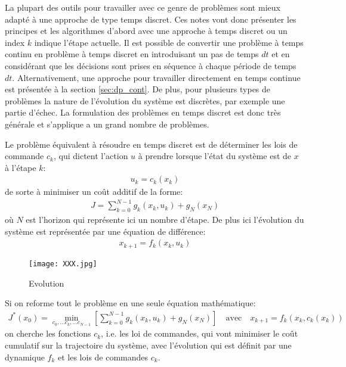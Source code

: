 La plupart des outils pour travailler avec ce genre de problèmes sont mieux adapté à une approche de type temps discret. Ces notes vont donc présenter les principes et les algorithmes d'abord avec une approche à temps discret ou un index $k$ indique l'étape actuelle. Il est possible de convertir une problème à temps continu en problème à temps discret en introduisant un pas de temps $dt$ et en considérant que les décisions sont prises en séquence à chaque période de temps $dt$. Alternativement, une approche pour travailler directement en temps continue est présentée à la section \ref{sec:dp_cont}. De plus, pour plusieurs types de problèmes la nature de l'évolution du système est discrètes, par exemple une partie d'échec. La formulation des problèmes en temps discret est donc très générale et s'applique a un grand nombre de problèmes.

Le problème équivalent à résoudre en temps discret est de déterminer les lois de commande $c_k$, qui dictent l'action $u$ à prendre lorsque l'état du système est de $x$ à l'étape $k$:
\begin{align}
u_k = c_k( x_k )
\end{align}
de sorte à minimiser un coût additif de la forme:
\begin{align}
    J = \sum_{k=0}^{N-1} g_k(x_k, u_k) + g_N( x_N )
\end{align}
où $N$ est l'horizon qui représente ici un nombre d'étape. De plus ici l'évolution du système est représentée par une équation de différence:
\begin{align}
    x_{k+1} = f_k( x_k, u_k)
\end{align}

\begin{figure}[H]
	\centering
	\vspace{-10pt}
		\texttt{[image: XXX.jpg]}
		\caption{Evolution}
		\label{fig:evolution}
\end{figure}

Si on reforme tout le problème en une seule équation mathématique:
\begin{align}
    J^*(x_0) = \min_{c_0, ... c_k, ... c_{N-1}} 
    \left[ \sum_{k=0}^{N-1} g_k(x_k, u_k) + g_N( x_N )
    \right] \quad
    \text{avec} \quad
    x_{k+1} = f_k( x_k, c_k(x_k) )
\end{align}
on cherche les fonctions $c_k$, i.e. les loi de commandes, qui vont minimiser le coût cumulatif  sur la trajectoire du système, avec l'évolution qui est définit par une dynamique $f_k$ et les lois de commandes $c_k$.


